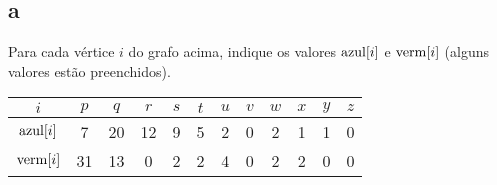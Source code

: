 \begin{figure}[H]
    \centering
    
    \caption{}
\end{figure}

\subsection{a} Para cada vértice $i$ do grafo acima, indique os valores $\mathrm{azul}[i]$ e $\mathrm{verm}[i]$ (alguns valores estão preenchidos).

\itemdsep[0.25]

\begin{table}[H]
    \centering
    \begin{tabular}{|c|c|c|c|c|c|c|c|c|c|c|c|}
        \hline
        $i$ & $p$ & $q$ & $r$ & $s$ & $t$ & $u$ & $v$ & $w$ & $x$ & $y$ & $z$ \\
        \hline
        $\mathrm{azul}[i]$ &  7 & 20 & 12 & 9 & 5 & 2 & 0 & 2 & 1 & 1 & 0 \\
        \hline
        $\mathrm{verm}[i]$ & 31 & 13 &  0 & 2 & 2 & 4 & 0 & 2 & 2 & 0 & 0 \\
        \hline
    \end{tabular}
\end{table}

